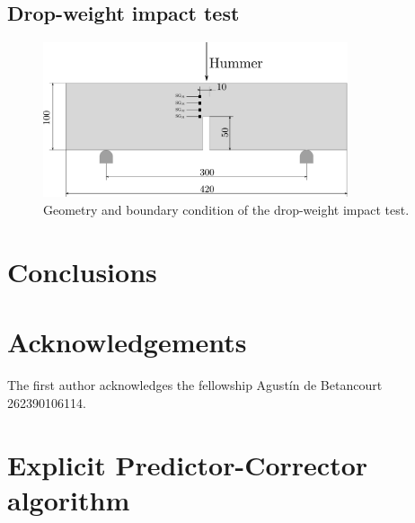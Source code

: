 \documentclass[preprint,12pt,a4paper]{elsarticle}
\begin{document}
\subsection{Drop-weight impact test}
\label{sec:3.3}

\begin{figure}
  \centering
  \includegraphics[width=0.8\textwidth]{Figures/Drop_weight}
  \caption{Geometry and boundary condition of the drop-weight impact test.}
  \label{fig:geometry-drop-weight-impact-test}
\end{figure}


\section{Conclusions}
\label{sec:6}


\section*{Acknowledgements}
The first author acknowledges the fellowship Agustín de Betancourt 262390106114.

\appendix

\clearpage

\section{Explicit Predictor-Corrector algorithm}
\label{sec:expl-pred-corr}
\end{document}
